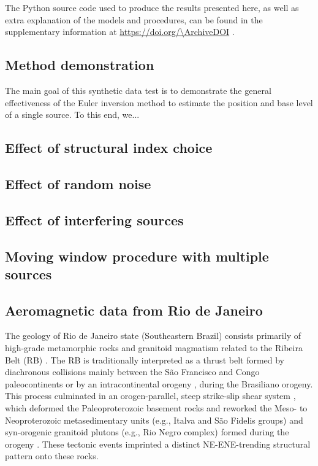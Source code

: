 \noindent
The Python source code used to produce the results presented here, as well as extra explanation of the models and procedures, can be found in the supplementary information at \url{https://doi.org/\ArchiveDOI} \citep{figshare}.


\subsection{Method demonstration}
\label{sec:proof}

The main goal of this synthetic data test is to demonstrate the general effectiveness of the Euler inversion method to estimate the position and base level of a single source.
To this end, we...
\SynProofTrueEast{}
\SynProofInt{}
\SynProofTrueBase{}



\subsection{Effect of structural index choice}
\label{sec:si}



\subsection{Effect of random noise}
\label{sec:noise}



\subsection{Effect of interfering sources}
\label{sec:interf}



\subsection{Moving window procedure with multiple sources}
\label{sec:windows}



\subsection{Aeromagnetic data from Rio de Janeiro}
\label{sec:rio}

The geology of Rio de Janeiro state (Southeastern Brazil) consists primarily of
high-grade metamorphic rocks and granitoid magmatism related to the Ribeira
Belt (RB) \citep{Heilbron2020}. The RB is traditionally interpreted as a thrust
belt formed by diachronous collisions mainly between the São Francisco and
Congo paleocontinents \citep{Heilbron2008, Trouw2000} or by an intracontinental
orogeny \citep[\textit{e.g.}][]{Meira2015, Meira2019}, during the Brasiliano
orogeny. This process culminated in an orogen-parallel, steep strike-slip shear
system \citep{EgydioSilva2005}, which deformed the Paleoproterozoic basement
rocks and reworked the Meso- to Neoproterozoic metasedimentary units (e.g.,
Italva and São Fidelis groups) and syn-orogenic granitoid plutons (e.g., Rio
Negro complex) formed during the orogeny \citep{Heilbron2003, Heilbron2020}.
These tectonic events imprinted a distinct NE-ENE-trending structural pattern
onto these rocks.

